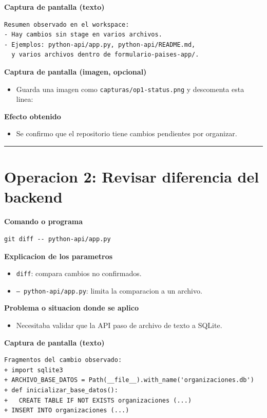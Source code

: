 \documentclass[12pt,a4paper]{article}
\begin{document}
\textbf{Captura de pantalla (texto)}
\begin{Verbatim}[fontsize=\small,frame=single]
Resumen observado en el workspace:
- Hay cambios sin stage en varios archivos.
- Ejemplos: python-api/app.py, python-api/README.md,
  y varios archivos dentro de formulario-paises-app/.
\end{Verbatim}

\textbf{Captura de pantalla (imagen, opcional)}
\begin{itemize}[leftmargin=*]
\item Guarda una imagen como \texttt{capturas/op1-status.png} y descomenta esta linea:
\end{itemize}

\textbf{Efecto obtenido}
\begin{itemize}[leftmargin=*]
\item Se confirmo que el repositorio tiene cambios pendientes por organizar.
\end{itemize}

\hrule
\vspace{0.4cm}

\section*{Operacion 2: Revisar diferencia del backend}
\textbf{Comando o programa}
\begin{Verbatim}[fontsize=\small,frame=single]
git diff -- python-api/app.py
\end{Verbatim}

\textbf{Explicacion de los parametros}
\begin{itemize}[leftmargin=*]
\item \texttt{diff}: compara cambios no confirmados.
\item \texttt{-- python-api/app.py}: limita la comparacion a un archivo.
\end{itemize}

\textbf{Problema o situacion donde se aplico}
\begin{itemize}[leftmargin=*]
\item Necesitaba validar que la API paso de archivo de texto a SQLite.
\end{itemize}

\textbf{Captura de pantalla (texto)}
\begin{Verbatim}[fontsize=\small,frame=single]
Fragmentos del cambio observado:
+ import sqlite3
+ ARCHIVO_BASE_DATOS = Path(__file__).with_name('organizaciones.db')
+ def inicializar_base_datos():
+   CREATE TABLE IF NOT EXISTS organizaciones (...)
+ INSERT INTO organizaciones (...)
\end{Verbatim}
\end{document}
